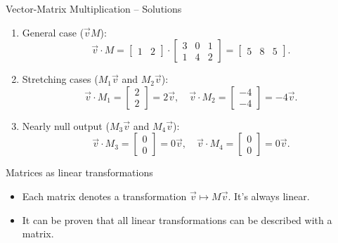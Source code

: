 \documentclass{beamer}
\begin{document}
\begin{frame}{Vector-Matrix Multiplication – Solutions}
  \begin{enumerate}
    \item General case (\(\vec{v}M\)):
    \begin{equation}
    \vec{v} \cdot M = \begin{bmatrix} 1 & 2 \end{bmatrix} \cdot
    \begin{bmatrix} 3 & 0 & 1 \\ 1 & 4 & 2 \end{bmatrix}
    = \begin{bmatrix} 5 & 8 & 5 \end{bmatrix}.
    \end{equation}
    \item Stretching cases (\(M_1\vec{v}\) and \(M_2\vec{v}\)):
    \begin{equation}
    \vec{v} \cdot M_1 = \begin{bmatrix} 2 \\ 2 \end{bmatrix}=2\vec{v}, \quad
    \vec{v} \cdot M_2 = \begin{bmatrix} -4 \\ -4 \end{bmatrix} = -4\vec{v}.
    \end{equation}
    \item Nearly null output (\(M_3\vec{v}\) and \(M_4\vec{v}\)):
    \begin{equation}
    \vec{v} \cdot M_3 = \begin{bmatrix} 0 \\ 0 \end{bmatrix}=0\vec{v}, \quad
    \vec{v} \cdot M_4 = \begin{bmatrix} 0 \\ 0 \end{bmatrix}=0\vec{v}.
    \end{equation}
  \end{enumerate}
\end{frame}

\begin{frame}{Matrices as linear transformations}

\begin{itemize}
    \item Each matrix denotes a transformation $\vec{v} \mapsto M\vec{v}$. It's always linear.
    \item It can be proven that all linear transformations can be described with a matrix.
    
\end{itemize}
    
\end{frame}
\end{document}
